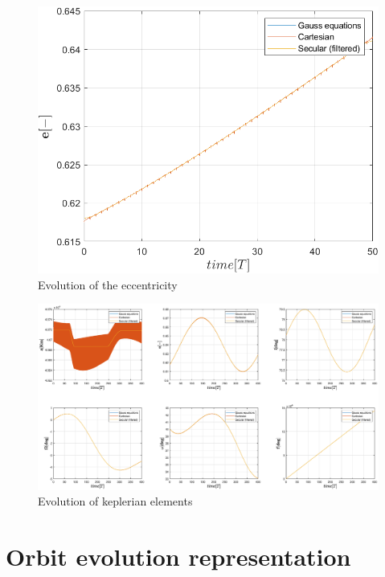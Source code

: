 \documentclass[11pt,a4paper]{report}
\begin{document}
\begin{figure}[]
    \centering
    \includegraphics[width=\textwidth]{e.png}
    \caption{Evolution of the eccentricity}
\end{figure}

\begin{figure}[]

    \includegraphics[width=1.3\textwidth,height=1.3\textheight,keepaspectratio]{400_T.eps}
    \caption{Evolution of keplerian elements}
\end{figure}

\section{Orbit evolution representation}
\end{document}
